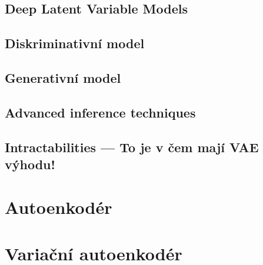 \documentclass[11pt,a4paper]{report}
\begin{document}
\section{Deep Latent Variable Models}
\section{Diskriminativní model}
\section{Generativní model}
\label{sec:generative_model}
\section{Advanced inference techniques}
\section{Intractabilities --- To je v čem mají VAE výhodu!}

\chapter{Autoenkodér}
\label{chap:autoencoder}
















\chapter{Variační autoenkodér}
\label{chap:vae}







\end{document}
